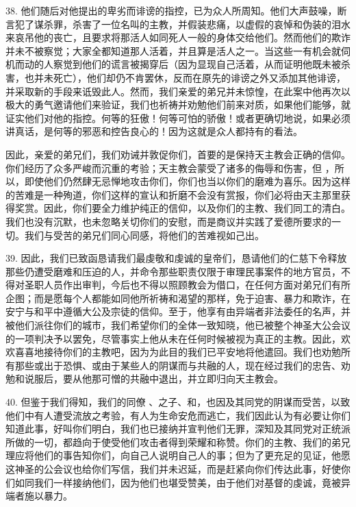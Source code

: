 38. 他们随后对他提出的卑劣而诽谤的指控，已为众人所周知。他们大声鼓噪，断言犯了谋杀罪，杀害了一位名叫的主教，并假装悲痛，以虚假的哀悼和伪装的泪水来哀吊他的丧亡，且要求将那活人如同死人一般的身体交给他们。然而他们的欺诈并未不被察觉；大家全都知道那人活着，并且算是活人之一。当这些一有机会就伺机而动的人察觉到他们的谎言被揭穿后（因为显现自己活着，从而证明他既未被杀害，也并未死亡），他们却仍不肯罢休，反而在原先的诽谤之外又添加其他诽谤，并采取新的手段来诋毁此人。然而，我们亲爱的弟兄并未惊惶，在此案中他再次以极大的勇气邀请他们来验证，我们也祈祷并劝勉他们前来对质，如果他们能够，就证实他们对他的指控。何等的狂傲！何等可怕的骄傲！或者更确切地说，如果必须讲真话，是何等的邪恶和控告良心的！因为这就是众人都持有的看法。\par

因此，亲爱的弟兄们，我们劝诫并敦促你们，首要的是保持天主教会正确的信仰。你们经历了众多严峻而沉重的考验；天主教会蒙受了诸多的侮辱和伤害，但 ，所以，即使他们仍然肆无忌惮地攻击你们，你们也当以你们的磨难为喜乐。因为这样的苦难是一种殉道，你们这样的宣认和折磨不会没有赏报，你们必将由天主那里获得奖赏。因此，你们要全力维护纯正的信仰，以及你们的主教、我们同工的清白。我们也没有沉默，也未忽略关切你们的安慰，而是商议并实践了爱德所要求的一切。我们与受苦的弟兄们同心同感，将他们的苦难视如己出。\par

39. 因此，我们已致函恳请我们最虔敬和虔诚的皇帝们，恳请他们的仁慈下令释放那些仍遭受磨难和压迫的人，并命令那些职责仅限于审理民事案件的地方官员，不得对圣职人员作出审判，今后也不得以照顾教会为借口，在任何方面对弟兄们有所企图；而是愿每个人都能如同他所祈祷和渴望的那样，免于迫害、暴力和欺诈，在安宁与和平中遵循大公及宗徒的信仰。至于，他享有由异端者非法委任的名声，并被他们派往你们的城市，我们希望你们的全体一致知晓，他已被整个神圣大公会议的一项判决予以罢免，尽管事实上他从未在任何时候被视为真正的主教。因此，欢欢喜喜地接待你们的主教吧，因为为此目的我们已平安地将他遣回。我们也劝勉所有那些或出于恐惧、或由于某些人的阴谋而与共融的人，现在经过我们的忠告、劝勉和说服后，要从他那可憎的共融中退出，并立即归向天主教会。\par

40. 但鉴于我们得知，我们的同僚 、之子、和，也因及其同党的阴谋而受苦，以致他们中有人遭受流放之考验，有人为生命安危而逃亡，我们因此认为有必要让你们知道此事，好叫你们明白，我们也已接纳并宣判他们无罪，深知及其同党对正统派所做的一切，都趋向于使受他们攻击者得到荣耀和称赞。你们的主教、我们的弟兄理应将他们的事告知你们，向自己人说明自己人的事；但为了更充足的见证，他愿这神圣的公会议也给你们写信，我们并未迟延，而是赶紧向你们传达此事，好使你们如同我们一样接纳他们，因为他们也堪受赞美，由于他们对基督的虔诚，竟被异端者施以暴力。\par

